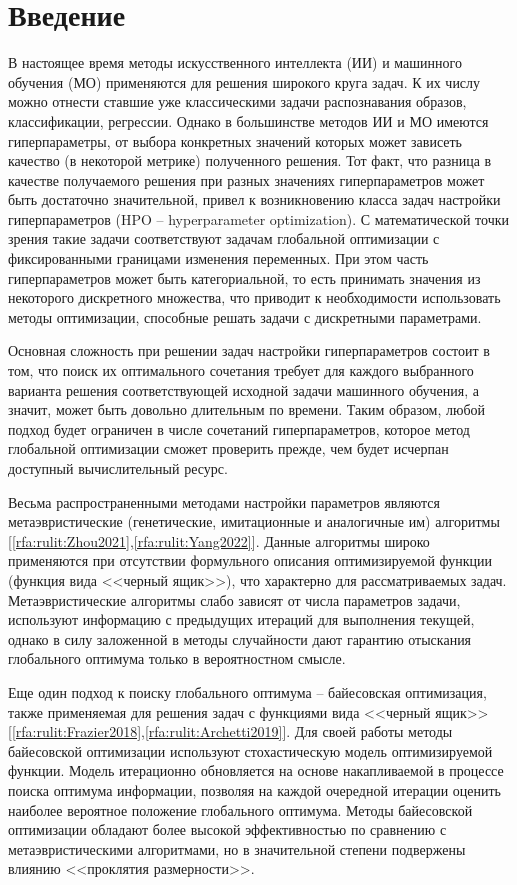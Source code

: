 \documentclass[a4paper,12pt,russian]{article}
\begin{document}
\section{Введение}


В настоящее время методы искусственного интеллекта (ИИ) и машинного обучения (МО) применяются для решения широкого круга задач. К их числу можно отнести ставшие уже классическими задачи распознавания образов, классификации, регрессии. 
Однако в большинстве методов ИИ и МО имеются гиперпараметры, от выбора конкретных значений которых может зависеть качество (в некоторой метрике) полученного решения. Тот факт, что разница в качестве получаемого решения при разных значениях гиперпараметров может быть достаточно значительной, привел к возникновению класса задач настройки гиперпараметров (HPO -- hyperparameter optimization). С математической точки зрения такие задачи соответствуют задачам глобальной оптимизации с фиксированными границами изменения переменных. При этом часть гиперпараметров может быть категориальной, то есть принимать значения из некоторого дискретного множества, что приводит к необходимости использовать методы оптимизации, способные решать задачи с дискретными параметрами.

Основная сложность при решении  задач настройки гиперпараметров состоит  в  том, что поиск их оптимального сочетания требует для каждого выбранного варианта решения соответствующей исходной задачи машинного обучения, а значит, может быть довольно длительным по времени. Таким образом, любой подход будет ограничен в числе сочетаний гиперпараметров, которое метод глобальной оптимизации сможет проверить прежде, чем будет исчерпан доступный вычислительный ресурс. 

Весьма распространенными методами настройки параметров являются метаэвристические (генетические, имитационные и аналогичные им) алгоритмы [\ref{rfa:rulit:Zhou2021},\ref{rfa:rulit:Yang2022}]. Данные алгоритмы широко применяются при отсутствии формульного описания оптимизируемой функции (функция вида <<черный ящик>>), что характерно для рассматриваемых задач. Метаэвристические алгоритмы слабо зависят от числа параметров задачи, используют информацию с предыдущих итераций для выполнения текущей, однако в силу заложенной в методы случайности дают гарантию отыскания глобального оптимума только в вероятностном смысле.

Еще один подход к поиску глобального оптимума -- байесовская оптимизация, также применяемая для решения задач с функциями вида <<черный ящик>> [\ref{rfa:rulit:Frazier2018},\ref{rfa:rulit:Archetti2019}]. Для своей работы методы байесовской оптимизации используют стохастическую модель оптимизируемой функции. Модель итерационно обновляется на основе накапливаемой в процессе поиска оптимума информации, позволяя на каждой очередной итерации оценить наиболее вероятное положение глобального оптимума. Методы байесовской оптимизации обладают более  высокой  эффективностью по сравнению с метаэвристическими алгоритмами, но в значительной степени подвержены влиянию <<проклятия размерности>>.
\end{document}
